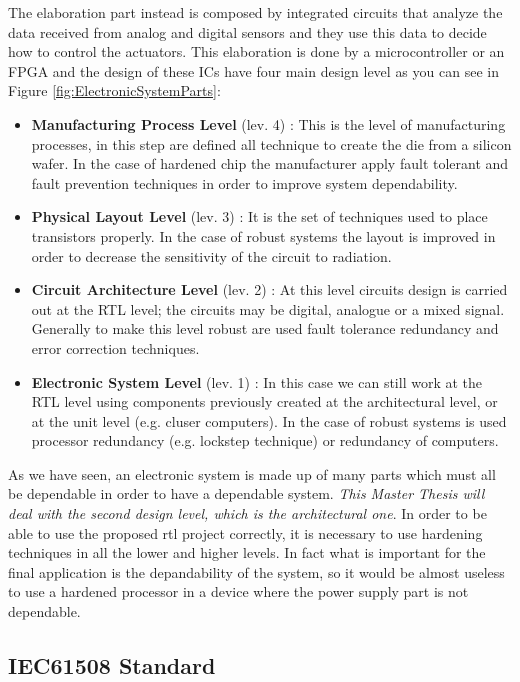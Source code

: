 {{{			The elaboration part instead is composed by integrated circuits that analyze the data received from analog and digital sensors and they use this data to decide how to control the actuators. This elaboration is done by a microcontroller or an FPGA and the design of these ICs have four main design level \cite{ECSS2016} as you can see in Figure \ref{fig:ElectronicSystemParts}:
			\begin{itemize}
				\item \textbf{Manufacturing Process Level } (lev. 4) : This is the level of manufacturing processes, in this step are defined all technique to create the die from a silicon wafer. In the case of hardened chip the manufacturer apply fault tolerant and fault prevention techniques in order to improve system dependability. 
				\item \textbf{Physical Layout Level} (lev. 3) : It is the set of techniques used to place transistors properly. In the case of robust systems the layout is improved in order to decrease the sensitivity of the circuit to radiation.
				\item \textbf{Circuit Architecture Level } (lev. 2) : At this level circuits design is carried out at the RTL level; the circuits may be digital, analogue or a mixed signal. Generally to make this level robust are used fault tolerance redundancy and error correction techniques.   
				\item \textbf{Electronic System Level } (lev. 1) : In this case we can still work at the RTL level using components previously created at the architectural level, or at the unit level (e.g. cluser computers). In the case of robust systems is used processor redundancy (e.g. lockstep technique) or redundancy of computers.
			\end{itemize}  
		
		
			As we have seen, an electronic system is made up of many parts which must all be dependable in order to have a dependable system. \textit{This Master Thesis will deal with the second design level, which is the architectural one}. In order to be able to use the proposed rtl project correctly, it is necessary to use hardening techniques in all the lower and higher levels. In fact what is important for the final application is the depandability of the system, so it would be almost useless to use a hardened processor in a device where the power supply part is not dependable.
		
		} %
		\subsection{IEC61508 Standard}{
			
}}}
